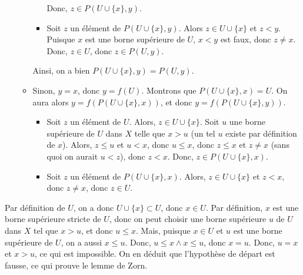 \begin{itemize}
\begin{itemize}[nosep]
\begin{itemize}[nosep]
                        Donc, $z \in P(U \cup \lbrace x \rbrace, y)$.
                    \item Soit $z$ un élément de $P(U \cup \lbrace x \rbrace, y)$.
                        Alors $z \in U \cup \lbrace x \rbrace$ et $z < y$.
                        Puisque $x$ est une borne supérieure de $U$, $x < y$ est faux, donc $z \neq x$.
                        Donc, $z \in U$, donc $z \in P(U, y)$.
                \end{itemize}
                Ainsi, on a bien $P(U \cup \lbrace x \rbrace, y) = P(U, y)$.
            \item Sinon, $y = x$, donc $y = f(U)$. 
                Montrons que $P(U \cup \lbrace x \rbrace, x) = U$.
                On aura alors $y = f(P(U \cup \lbrace x \rbrace, x))$, et donc $y = f(P(U \cup \lbrace x \rbrace, y))$. 
                \begin{itemize}[nosep]
                    \item Soit $z$ un élément de $U$.
                        Alors, $z \in U \cup \lbrace x \rbrace$.
                        Soit $u$ une borne supérieure de $U$ dans $X$ telle que $x > u$ (un tel $u$ existe par définition de $x$).
                        Alors, $z \leq u$ et $u < x$, donc $u \leq x$, donc $z \leq x$ et $z \neq x$ (sans quoi on aurait $u < z$), donc $z < x$.
                        Donc, $z \in P(U \cup \lbrace x \rbrace, x)$.
                    \item Soit $z$ un élément de $P(U \cup \lbrace x \rbrace, x)$.
                        Alors, $z \in U \cup \lbrace x \rbrace$ et $z < x$, donc $z \neq x$, donc $z \in U$.
                \end{itemize}
        \end{itemize}
\end{itemize}

\done

\medskip

Par définition de $U$, on a donc $U \cup \lbrace x \rbrace \subset U$, donc $x \in U$. 
Par définition, $x$ est une borne supérieure stricte de $U$, donc on peut choisir une borne supérieure $u$ de $U$ dans $X$ tel que $x > u$, et donc $u \leq x$. 
Mais, puisque $x \in U$ et $u$ est une borne supérieure de $U$, on a aussi $x \leq u$. 
Donc, $u \leq x \wedge x \leq u$, donc $x = u$.
Donc, $u = x$ et $x > u$, ce qui est impossible. 
On en déduit que l'hypothèse de départ est fausse, ce qui prouve le lemme de Zorn.
